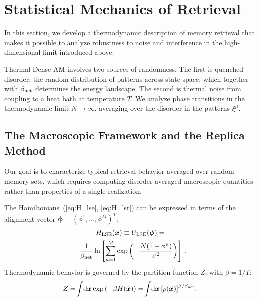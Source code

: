 \documentclass{article}
\newcommand{\dd}{{\mathrm{d}}}
\theoremstyle{plain}
\theoremstyle{definition}
\theoremstyle{remark}
\begin{document}
\section{Statistical Mechanics of Retrieval}\label{sec:statmech}

In this section, we develop a thermodynamic description of memory retrieval that makes it possible to analyze robustness to noise and interference in the high-dimensional limit introduced above.

Thermal Dense AM involves two sources of randomness. The first is quenched disorder: the random distribution of patterns across state space, which together with $\beta_{\rm net}$ determines the energy landscape. The second is thermal noise from coupling to a heat bath at temperature $T$. We analyze phase transitions in the thermodynamic limit $N \to \infty$, averaging over the disorder in the patterns $\xi^\mu$.

\subsection{The Macroscopic Framework and the Replica Method}

Our goal is to characterize typical retrieval behavior averaged over random memory sets, which requires computing disorder-averaged macroscopic quantities rather than properties of a single realization.

The Hamiltonians~(\ref{eq:H_lse}, \ref{eq:H_lsr}) can be expressed in terms of the alignment vector $\bm{\phi} = (\phi^1, \dots, \phi^M)^T$:
\begin{multline}
    H_{\rm LSE}(\bm{x}) \equiv U_{\rm LSE}(\bm{\phi}) = \\ -\frac{1}{\beta_{\rm net}} \ln \left[ \sum_{\mu=1}^M \exp\left( -\frac{N(1 - \phi^\mu)}{\sigma^2} \right) \right]\,.
\end{multline}
Thermodynamic behavior is governed by the partition function $Z$, with $\beta = 1/T$:
\begin{equation}
    Z = \!\int\!\dd \bm{x} \exp\left( -\beta H(\bm{x}) \right) = \!\int\! \dd \bm{x} \left[ p(\bm{x}) \right]^{\beta/\beta_{\rm net}}\!.
    \label{eq:partition}
\end{equation}
\end{document}
